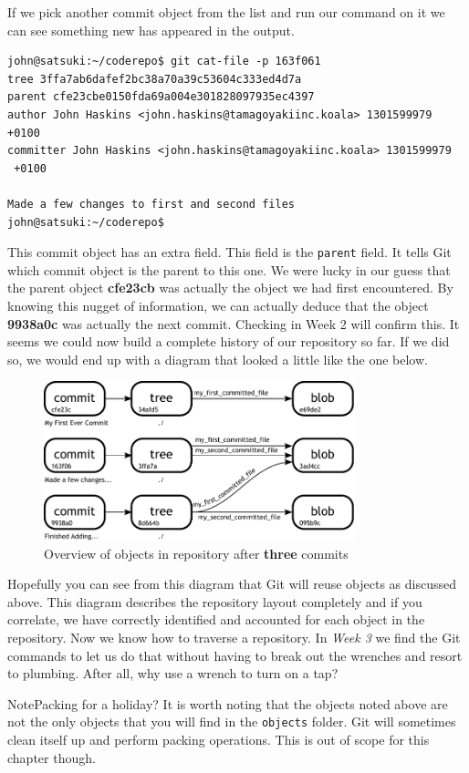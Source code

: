 If we pick another commit object from the list and run our command on it we can see something new has appeared in the output.

\begin{Verbatim}
john@satsuki:~/coderepo$ git cat-file -p 163f061
tree 3ffa7ab6dafef2bc38a70a39c53604c333ed4d7a
parent cfe23cbe0150fda69a004e301828097935ec4397
author John Haskins <john.haskins@tamagoyakiinc.koala> 1301599979 +0100
committer John Haskins <john.haskins@tamagoyakiinc.koala> 1301599979
 +0100

Made a few changes to first and second files
john@satsuki:~/coderepo$
\end{Verbatim}

This commit object has an extra field.
This field is the \texttt{parent} field.
It tells Git which commit object is the parent to this one.
We were lucky in our guess that the parent object \textbf{cfe23cb} was actually the object we had first encountered.
By knowing this nugget of information, we can actually deduce that the object \textbf{9938a0c} was actually the next commit.
Checking in Week 2 will confirm this.
It seems we could now build a complete history of our repository so far.
If we did so, we would end up with a diagram that looked a little like the one below.

\begin{figure}[hbt]
\centering
\includegraphics[width=9cm]{images/f-af2-d3.pdf}
\caption{Overview of objects in repository after \textbf{three} commits}
\end{figure}

Hopefully you can see from this diagram that Git will reuse objects as discussed above.
This diagram describes the repository layout completely and if you correlate, we have correctly identified and accounted for each object in the repository.
Now we know how to traverse a repository.
In \emph{Week 3} we find the Git commands to let us do that without having to break out the wrenches and resort to plumbing.
After all, why use a wrench to turn on a tap?

\begin{callout}{Note}{Packing for a holiday?}
It is worth noting that the objects noted above are not the only objects that you will find in the \texttt{objects} folder.
Git will sometimes clean itself up and perform packing operations.
This is out of scope for this chapter though.
\end{callout}
